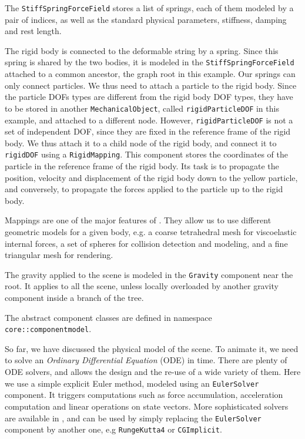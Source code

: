 The \texttt{StiffSpringForceField} stores a list of springs, each of them modeled by a pair of indices, as well as the standard physical parameters, stiffness, damping and rest length.

The rigid body is connected to the deformable string by a spring.
Since this spring is shared by the two bodies, it is modeled in the \texttt{StiffSpringForceField} attached to a common ancestor, the graph root in this example.
Our springs can only connect particles. 
We thus need to attach a particle to the rigid body. 
Since the particle DOFs types are different from the rigid body DOF types, they have to be stored in another \texttt{MechanicalObject}, called \texttt{rigidParticleDOF} in this example, and attached to a different node.
However, \texttt{rigidParticleDOF} is not a set of independent DOF, since they are fixed in the reference frame of the rigid body. We thus attach it to a child node of the rigid body, and connect it to \texttt{rigidDOF} using a \texttt{RigidMapping}. 
This component stores the coordinates of the particle in the reference frame of the rigid body. 
Its task is to propagate the position, velocity and displacement of the rigid body down to the yellow particle, and conversely, to propagate the forces applied to the particle up to the rigid body.

Mappings are one of the major features of \sofa. 
They allow us to use different geometric models for a given body, e.g. a coarse tetrahedral mesh for viscoelastic internal forces, a set of spheres for collision detection and modeling, and a fine triangular mesh for rendering.

The gravity applied to the scene is modeled in the \texttt{Gravity} component near the root. 
It applies to all the scene, unless locally overloaded by another gravity component inside a branch of the tree.

The abstract component classes are defined in namespace \texttt{core::componentmodel}.

So far, we have discussed the physical model of the scene.
To animate it, we need to solve an \textit{Ordinary Differential Equation} (ODE) in time.
There are plenty of ODE solvers, and \sofa{} allows the design and the re-use of a wide variety of them.
Here we use a simple explicit Euler method, modeled using an \texttt{EulerSolver} component.
It triggers computations such as force accumulation, acceleration computation and linear operations on state vectors.
More sophisticated solvers are available in \sofa, and can be used by simply replacing the  \texttt{EulerSolver} component by another one, e.g \texttt{RungeKutta4} or \texttt{CGImplicit}.

